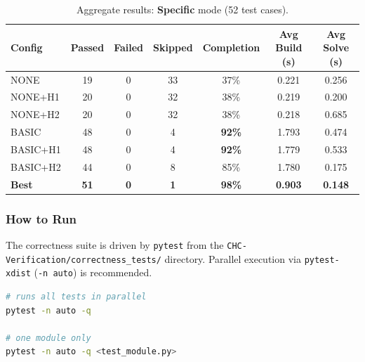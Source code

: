 \begin{table}[H]
\centering
\caption{Aggregate results: \textbf{Specific} mode (52 test cases).}
\label{tab:agg-specific-m3}
\begin{tabular}{lcccccc}
\toprule
\textbf{Config} & \textbf{Passed} & \textbf{Failed} & \textbf{Skipped} & \textbf{Completion} & \textbf{Avg Build (s)} & \textbf{Avg Solve (s)} \\
\midrule
NONE     & 19 & 0 & 33 & 37\% & 0.221 & 0.256 \\
NONE+H1  & 20 & 0 & 32 & 38\% & 0.219 & 0.200 \\
NONE+H2  & 20 & 0 & 32 & 38\% & 0.218 & 0.685 \\
BASIC    & 48 & 0 &  4 & \textbf{92\%} & 1.793 & 0.474 \\
BASIC+H1 & 48 & 0 &  4 & \textbf{92\%} & 1.779 & 0.533 \\
BASIC+H2 & 44 & 0 &  8 & 85\% & 1.780 & 0.175 \\
\midrule
\textbf{Best} & \textbf{51} & \textbf{0} & \textbf{1} & \textbf{98\%} & \textbf{0.903} & \textbf{0.148} \\
\bottomrule
\end{tabular}
\end{table}

\subsubsection*{How to Run}

The correctness suite is driven by \texttt{pytest} from the \texttt{CHC-Verification/correctness\_tests/} directory.
Parallel execution via \texttt{pytest-xdist} (\texttt{-n auto}) is recommended.

\begin{lstlisting}[style=terminal, language=bash]
# runs all tests in parallel
pytest -n auto -q 

# one module only
pytest -n auto -q <test_module.py>
\end{lstlisting}
